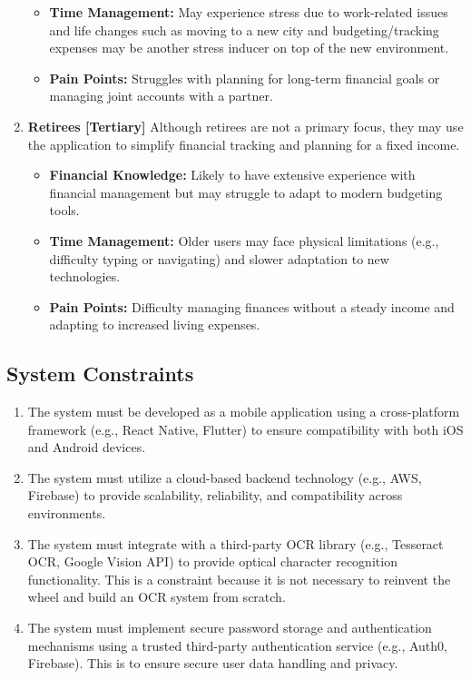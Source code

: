 \documentclass[12pt]{article}
\begin{document}
\begin{enumerate}
\begin{itemize}
			\item \textbf{Time Management:} May experience stress due to work-related issues and life changes such as moving to a new city and budgeting/tracking expenses may be another stress inducer on top of the new environment.
			\item \textbf{Pain Points:} Struggles with planning for long-term financial goals or managing joint accounts with a partner.
		\end{itemize}
	\item \textbf{Retirees [Tertiary]}
		Although retirees are not a primary focus, they may use the application to simplify financial tracking and planning for a fixed income.
		\begin{itemize}
			\item \textbf{Financial Knowledge:} Likely to have extensive experience with financial management but may struggle to adapt to modern budgeting tools.
			\item \textbf{Time Management:} Older users may face physical limitations (e.g., difficulty typing or navigating) and slower adaptation to new technologies.
			\item \textbf{Pain Points:} Difficulty managing finances without a steady income and adapting to increased living expenses.
		\end{itemize}
\end{enumerate}

\newpage

\subsection{System Constraints}


\begin{enumerate}[label=C\arabic*]
  \item The system must be developed as a mobile application using a
  cross-platform framework (e.g., React Native, Flutter) to ensure
  compatibility with both iOS and Android devices.
  \item The system must utilize a cloud-based backend technology (e.g., AWS,
  Firebase) to provide scalability, reliability, and compatibility across
  environments.
  \item The system must integrate with a third-party OCR library (e.g.,
  Tesseract OCR, Google Vision API) to provide optical character recognition
  functionality. This is a constraint because it is not necessary to
  reinvent the wheel and build an OCR system from scratch.
  \item The system must implement secure password storage and authentication
  mechanisms using a trusted third-party authentication service (e.g., Auth0,
  Firebase). This is to ensure secure user data handling and privacy.
\end{enumerate}
\end{document}
